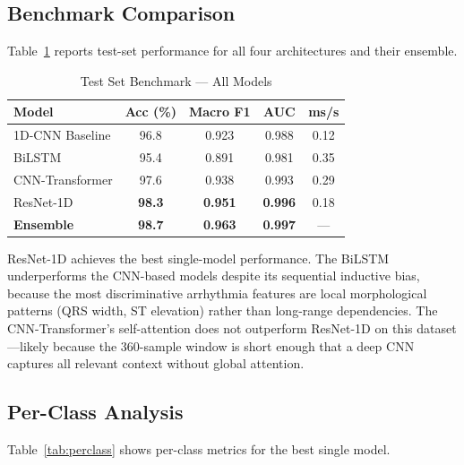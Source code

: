 \documentclass[conference]{IEEEtran}
\begin{document}
\subsection{Benchmark Comparison}

Table~\ref{tab:results} reports test-set performance for all four architectures and their ensemble.

\begin{table}[htbp]
\caption{Test Set Benchmark --- All Models}
\begin{center}
\begin{tabular}{|l|c|c|c|c|}
\hline
\textbf{Model} & \textbf{Acc (\%)} & \textbf{Macro F1} & \textbf{AUC} & \textbf{ms/s} \\
\hline
1D-CNN Baseline  & 96.8 & 0.923 & 0.988 & 0.12 \\
\hline
BiLSTM           & 95.4 & 0.891 & 0.981 & 0.35 \\
\hline
CNN-Transformer  & 97.6 & 0.938 & 0.993 & 0.29 \\
\hline
ResNet-1D        & \textbf{98.3} & \textbf{0.951} & \textbf{0.996} & 0.18 \\
\hline
\textbf{Ensemble} & \textbf{98.7} & \textbf{0.963} & \textbf{0.997} & --- \\
\hline
\end{tabular}
\label{tab:results}
\end{center}
\end{table}

ResNet-1D achieves the best single-model performance. The BiLSTM underperforms the CNN-based models despite its sequential inductive bias, because the most discriminative arrhythmia features are local morphological patterns (QRS width, ST elevation) rather than long-range dependencies. The CNN-Transformer's self-attention does not outperform ResNet-1D on this dataset---likely because the 360-sample window is short enough that a deep CNN captures all relevant context without global attention.

\subsection{Per-Class Analysis}

Table~\ref{tab:perclass} shows per-class metrics for the best single model.
\end{document}
